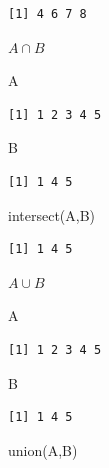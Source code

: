 \documentclass[
  letterpaper,
  DIV=11,
  numbers=noendperiod]{scrreprt}
\newenvironment{Shaded}{\begin{snugshade}}{\end{snugshade}}
\newcommand{\FunctionTok}[1]{\textcolor[rgb]{0.28,0.35,0.67}{#1}}
\newcommand{\NormalTok}[1]{\textcolor[rgb]{0.00,0.23,0.31}{#1}}
\begin{document}
\begin{verbatim}
[1] 4 6 7 8
\end{verbatim}

\(A\cap B\)

\begin{Shaded}
\begin{Highlighting}[]
\NormalTok{A}
\end{Highlighting}
\end{Shaded}

\begin{verbatim}
[1] 1 2 3 4 5
\end{verbatim}

\begin{Shaded}
\begin{Highlighting}[]
\NormalTok{B}
\end{Highlighting}
\end{Shaded}

\begin{verbatim}
[1] 1 4 5
\end{verbatim}

\begin{Shaded}
\begin{Highlighting}[]
\FunctionTok{intersect}\NormalTok{(A,B)}
\end{Highlighting}
\end{Shaded}

\begin{verbatim}
[1] 1 4 5
\end{verbatim}

\(A\cup B\)

\begin{Shaded}
\begin{Highlighting}[]
\NormalTok{A}
\end{Highlighting}
\end{Shaded}

\begin{verbatim}
[1] 1 2 3 4 5
\end{verbatim}

\begin{Shaded}
\begin{Highlighting}[]
\NormalTok{B}
\end{Highlighting}
\end{Shaded}

\begin{verbatim}
[1] 1 4 5
\end{verbatim}

\begin{Shaded}
\begin{Highlighting}[]
\FunctionTok{union}\NormalTok{(A,B)}
\end{Highlighting}
\end{Shaded}
\end{document}
